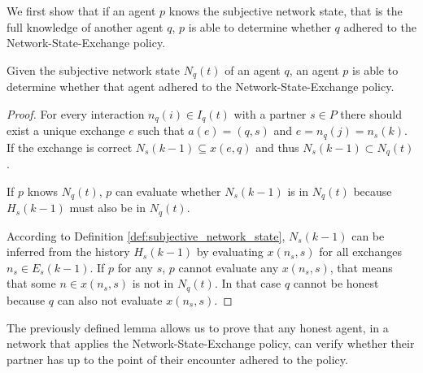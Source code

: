 

We first show that if an agent $p$ knows the subjective network state, that is the full knowledge of 
another agent $q$, $p$ is able to determine whether $q$ adhered to the Network-State-Exchange policy.


\begin{lem}
    \label{lem:detection_free-rider}
    Given the subjective network state $N_q(t)$ of an agent $q$, an agent $p$ is able to 
    determine whether that agent adhered to the Network-State-Exchange policy.
\end{lem}
\begin{proof}
    For every interaction $n_q(i) \in I_q(t)$ with a partner $s \in P$ there should exist a 
    unique exchange $e$ such that $a(e) = (q,s)$ and $e = n_q(j) = n_s(k)$. If the exchange
    is correct $N_s(k-1) \subseteq x(e,q)$ and thus $N_s(k-1) \subset N_q(t)$. 
    
    If $p$ knows $N_q(t)$, $p$ can evaluate whether $N_s(k-1)$ is in $N_q(t)$ because $H_s(k-1)$ 
    must also be in $N_q(t)$.
    
    According to Definition \ref{def:subjective_network_state}, $N_s(k-1)$ can be inferred from the 
    history $H_s(k-1)$ by evaluating $x(n_s, s)$ for all exchanges $n_s \in E_s(k-1)$. 
    If $p$ for any $s$, $p$ cannot evaluate any $x(n_s, s)$, that means that some $n \in x(n_s, s)$ 
    is not in $N_q(t)$. In that case $q$ cannot be honest because $q$ can also not evaluate 
    $x(n_s, s)$.
\end{proof}

The previously defined lemma allows us to prove that any honest agent, in a network that applies the
Network-State-Exchange policy, can verify whether their partner has up to the point of their encounter
adhered to the policy.


